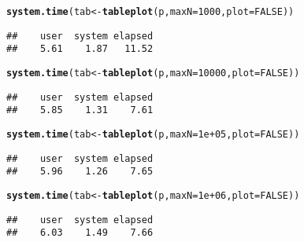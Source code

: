 \documentclass[11pt, fleqn, a4paper]{article}\usepackage[]{graphicx}\usepackage[]{color}
\makeatletter
\newcommand{\hlnum}[1]{\textcolor[rgb]{0.686,0.059,0.569}{#1}}%
\newcommand{\hlstd}[1]{\textcolor[rgb]{0.345,0.345,0.345}{#1}}%
\newcommand{\hlkwb}[1]{\textcolor[rgb]{0.69,0.353,0.396}{#1}}%
\newcommand{\hlkwc}[1]{\textcolor[rgb]{0.333,0.667,0.333}{#1}}%
\newcommand{\hlkwd}[1]{\textcolor[rgb]{0.737,0.353,0.396}{\textbf{#1}}}%
\newenvironment{kframe}{%
 \def\at@end@of@kframe{}%
 \ifinner\ifhmode%
  \def\at@end@of@kframe{\end{minipage}}%
  \begin{minipage}{\columnwidth}%
 \fi\fi%
 \def\FrameCommand##1{\hskip\@totalleftmargin \hskip-\fboxsep
 \colorbox{shadecolor}{##1}\hskip-\fboxsep
     \hskip-\linewidth \hskip-\@totalleftmargin \hskip\columnwidth}%
 \MakeFramed {\advance\hsize-\width
   \@totalleftmargin\z@ \linewidth\hsize
   \@setminipage}}%
 {\par\unskip\endMakeFramed%
 \at@end@of@kframe}
\newenvironment{knitrout}{}{} %
\makeatother
\begin{document}
\begin{knitrout}
\color{fgcolor}\begin{kframe}
\begin{alltt}
\hlkwd{system.time}\hlstd{(tab} \hlkwb{<-} \hlkwd{tableplot}\hlstd{(p,} \hlkwc{maxN} \hlstd{=} \hlnum{1000}\hlstd{,} \hlkwc{plot} \hlstd{=} \hlnum{FALSE}\hlstd{))}
\end{alltt}
\begin{verbatim}
##    user  system elapsed 
##    5.61    1.87   11.52
\end{verbatim}
\end{kframe}
\end{knitrout}


\begin{knitrout}
\color{fgcolor}\begin{kframe}
\begin{alltt}
\hlkwd{system.time}\hlstd{(tab} \hlkwb{<-} \hlkwd{tableplot}\hlstd{(p,} \hlkwc{maxN} \hlstd{=} \hlnum{10000}\hlstd{,} \hlkwc{plot} \hlstd{=} \hlnum{FALSE}\hlstd{))}
\end{alltt}
\begin{verbatim}
##    user  system elapsed 
##    5.85    1.31    7.61
\end{verbatim}
\end{kframe}
\end{knitrout}


\begin{knitrout}
\color{fgcolor}\begin{kframe}
\begin{alltt}
\hlkwd{system.time}\hlstd{(tab} \hlkwb{<-} \hlkwd{tableplot}\hlstd{(p,} \hlkwc{maxN} \hlstd{=} \hlnum{1e+05}\hlstd{,} \hlkwc{plot} \hlstd{=} \hlnum{FALSE}\hlstd{))}
\end{alltt}
\begin{verbatim}
##    user  system elapsed 
##    5.96    1.26    7.65
\end{verbatim}
\end{kframe}
\end{knitrout}


\begin{knitrout}
\color{fgcolor}\begin{kframe}
\begin{alltt}
\hlkwd{system.time}\hlstd{(tab} \hlkwb{<-} \hlkwd{tableplot}\hlstd{(p,} \hlkwc{maxN} \hlstd{=} \hlnum{1e+06}\hlstd{,} \hlkwc{plot} \hlstd{=} \hlnum{FALSE}\hlstd{))}
\end{alltt}
\begin{verbatim}
##    user  system elapsed 
##    6.03    1.49    7.66
\end{verbatim}
\end{kframe}
\end{knitrout}
\end{document}
